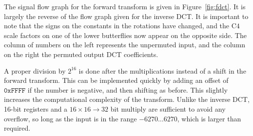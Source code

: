 \documentclass[9pt,letterpaper]{book}
\newcommand{\locvar}[1]{\ensuremath{\mathrm{#1}}}
\newcommand{\hex}[1]{\ensuremath{\mathtt{0x#1}}}
\numberwithin{equation}{chapter}
\numberwithin{figure}{chapter}
\numberwithin{table}{chapter}
\begin{document}
The signal flow graph for the forward transform is given in
 Figure~\ref{fig:fdct}.
It is largely the reverse of the flow graph given for the inverse DCT.
It is important to note that the signs on the constants in the rotations have
 changed, and the \locvar{C4} scale factors on one of the lower butterflies now
 appear on the opposite side.
The column of numbers on the left represents the unpermuted input, and the
 column on the right the permuted output DCT coefficients.

A proper division by $2^{16}$ is done after the multiplications instead of a
 shift in the forward transform.
This can be implemented quickly by adding an offset of $\hex{FFFF}$ if the
 number is negative, and then shifting as before.
This slightly increases the computational complexity of the transform.
Unlike the inverse DCT, 16-bit registers and a $16\times16\rightarrow32$ bit
 multiply are sufficient to avoid any overflow, so long as the input is in the
 range $-6270\ldots 6270$, which is larger than required.
\end{document}
